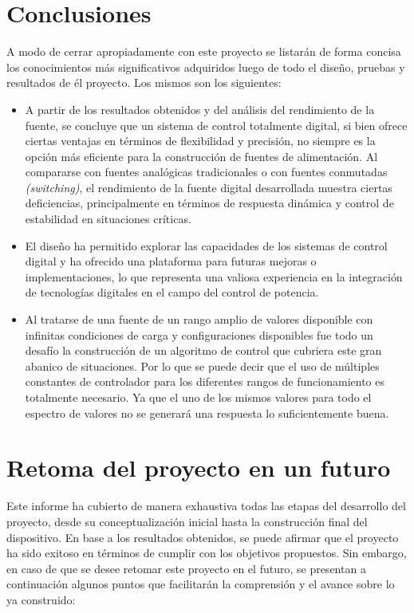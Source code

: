 \section{Conclusiones} 
A modo de cerrar apropiadamente con este proyecto se listarán de forma concisa los conocimientos más significativos adquiridos luego de todo el diseño, pruebas y resultados de él proyecto. Los mismos son los siguientes:\par 
\begin{itemize}
    \item A partir de los resultados obtenidos y del análisis del rendimiento de la fuente, se concluye que un sistema de control totalmente digital, si bien ofrece ciertas ventajas en términos de flexibilidad y precisión, no siempre es la opción más eficiente para la construcción de fuentes de alimentación. Al compararse con fuentes analógicas tradicionales o con fuentes conmutadas \textit{(switching)}, el rendimiento de la fuente digital desarrollada muestra ciertas deficiencias, principalmente en términos de respuesta dinámica y control de estabilidad en situaciones críticas.\par
    \item El diseño ha permitido explorar las capacidades de los sistemas de control digital y ha ofrecido una plataforma para futuras mejoras o implementaciones, lo que representa una valiosa experiencia en la integración de tecnologías digitales en el campo del control de potencia.
    \item Al tratarse de una fuente de un rango amplio de valores disponible con infinitas condiciones de carga y configuraciones disponibles fue todo un desafío la construcción de un algoritmo de control que cubriera este gran abanico de situaciones. Por lo que se puede decir que el uso de múltiples constantes de controlador para los diferentes rangos de funcionamiento es totalmente necesario. Ya que el uno de los mismos valores para todo el espectro de valores no se generará una respuesta lo suficientemente buena.
\end{itemize}

\section{Retoma del proyecto en un futuro} 
Este informe ha cubierto de manera exhaustiva todas las etapas del desarrollo del proyecto, desde su conceptualización inicial hasta la construcción final del dispositivo. En base a los resultados obtenidos, se puede afirmar que el proyecto ha sido exitoso en términos de cumplir con los objetivos propuestos. Sin embargo, en caso de que se desee retomar este proyecto en el futuro, se presentan a continuación algunos puntos que facilitarán la comprensión y el avance sobre lo ya construido:


